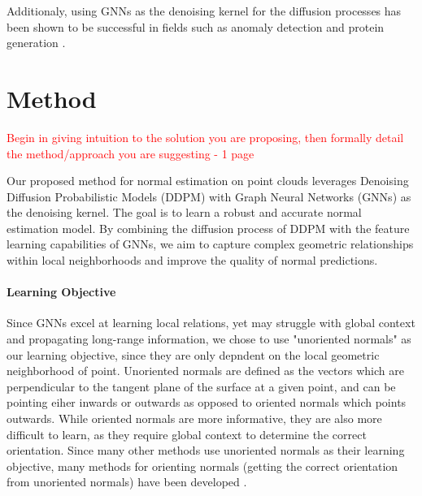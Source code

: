 \documentclass{acmart}
\begin{document}
Additionaly, using GNNs as the denoising kernel for the diffusion processes has been shown to be successful in fields such as anomaly detection \cite{ConGNN_2024} and protein generation \cite{ingraham2023illuminating}.

\section{Method}
\textcolor{red}{Begin in giving intuition to the solution you are proposing, then formally detail the method/approach you are suggesting -  1 page}

Our proposed method for normal estimation on point clouds leverages Denoising Diffusion Probabilistic Models (DDPM) with Graph Neural Networks (GNNs) as the denoising kernel. The goal is to learn a robust and accurate normal estimation model. By combining the diffusion process of DDPM with the feature learning capabilities of GNNs, we aim to capture complex geometric relationships within local neighborhoods and improve the quality of normal predictions.

\paragraph{Learning Objective}
Since GNNs excel at learning local relations, yet may struggle with global context and propagating long-range information, we chose to use "unoriented normals" as our learning objective, since they are only depndent on the local geometric neighborhood of point. Unoriented normals are defined as the vectors which are perpendicular to the tangent plane of the surface at a given point, and can be pointing eiher inwards or outwards as opposed to oriented normals which points outwards. While oriented normals are more informative, they are also more difficult to learn, as they require global context to determine the correct orientation. Since many other methods use unoriented normals as their learning objective, many methods for orienting normals (getting the correct orientation from unoriented normals) have been developed \cite{xu2023globally,gotsman2024linear}.
\end{document}
